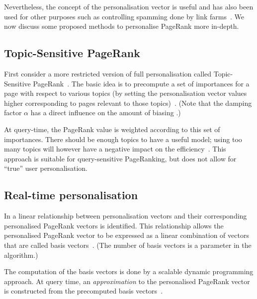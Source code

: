 \documentclass[a4paper,english,11pt]{scrartcl}
\begin{document}
Nevertheless, the concept of the personalisation vector is useful and has also been used for other purposes such as
controlling spamming done by link farms~\cite{deeper,math}.
We now discuss some proposed methods to personalise PageRank more in-depth.

\subsection{Topic-Sensitive PageRank}
First consider a more restricted version of full personalisation called Topic-Sensitive PageRank~\cite{personalizations}. The basic idea is to precompute a set of importances for a page with respect to various topics (by setting the personalisation vector values higher corresponding to pages relevant to those topics)~\cite{ilprints750}. (Note that the damping factor $\alpha$ has a direct influence on the amount of biasing \cite{personalizations}.)

At query-time, the PageRank value is weighted according to this set of importances. There should be enough topics to have a useful model; using too many topics will however have a negative impact on the efficiency~\cite{personalizations,ilprints750}. This approach is suitable for query-sensitive PageRanking, but does not allow for ``true'' user personalisation.
% 

\subsection{Real-time personalisation}

In \cite{Jeh:2003:SPW:775152.775191} a linear relationship between personalisation vectors and their corresponding personalised PageRank vectors is identified. This relationship allows the personalised PageRank vector to be expressed as a linear combination of vectors that are called basis vectors~\cite{deeper}. (The number of basis vectors is a parameter in the algorithm.) 

The computation of the basis vectors is done by a scalable dynamic
programming approach. At query time, an \emph{approximation} to the personalised PageRank
vector is constructed from the precomputed basis vectors~\cite{ilprints750,Jeh:2003:SPW:775152.775191,deeper}.
\end{document}
